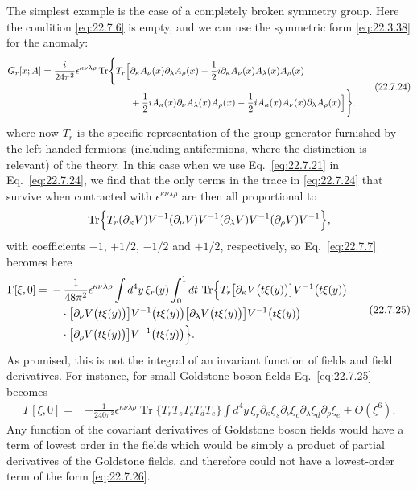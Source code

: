 The simplest example is the case of a completely broken symmetry group.
Here the condition \eqref{eq:22.7.6} is empty, and we can use the symmetric
form \eqref{eq:22.3.38} for the anomaly:
\begin{equation}
 \begin{aligned}
 G_r[x;A]
 =\frac{i}{24\pi^2}\epsilon^{\kappa\nu\lambda\rho}
 \operatorname{Tr}\Biggl\{T_r\Bigl[
 &\partial_\kappa A_\nu(x)\partial_\lambda A_\rho(x)
 -\frac{1}{2}i\partial_\kappa A_\nu(x)A_\lambda(x)A_\rho(x)
 \\
 &+\frac{1}{2}iA_\kappa(x)\partial_\nu A_\lambda(x)A_\rho(x)
 -\frac{1}{2}iA_\kappa(x)A_\nu(x)\partial_\lambda A_\rho(x)
 \Bigr]\Biggr\}.
 \end{aligned}
 \tag{22.7.24}\label{eq:22.7.24}
\end{equation}
where now $T_r$ is the specific representation of the group generator
furnished by the left-handed fermions (including antifermions, where the
distinction is relevant) of the theory. In this case when we use
Eq.~\eqref{eq:22.7.21} in Eq.~\eqref{eq:22.7.24}, we find that the only
terms in the trace in \eqref{eq:22.7.24} that survive when contracted with
$\epsilon^{\kappa\nu\lambda\rho}$ are then all proportional to
\[
 \operatorname{Tr}\Bigl\{
 T_r(\partial_\kappa V)V^{-1}(\partial_\nu V)V^{-1}
 (\partial_\lambda V)V^{-1}(\partial_\rho V)V^{-1}
 \Bigr\},
\]
with coefficients $-1$, $+1/2$, $-1/2$ and $+1/2$, respectively, so
Eq.~\eqref{eq:22.7.7} becomes here
\begin{equation}
 \begin{aligned}
 \Gamma[\xi,0]
 ={}&-\frac{1}{48\pi^2}\epsilon^{\kappa\nu\lambda\rho}
 \int d^4y\,\xi_r(y)\int_0^1dt\,
 \operatorname{Tr}\Bigl\{
 T_r\bigl[\partial_\kappa V\bigl(t\xi(y)\bigr)\bigr]
 V^{-1}\bigl(t\xi(y)\bigr)
 \\
 &\quad{}\cdot
 \bigl[\partial_\nu V\bigl(t\xi(y)\bigr)\bigr]
 V^{-1}\bigl(t\xi(y)\bigr)
 \bigl[\partial_\lambda V\bigl(t\xi(y)\bigr)\bigr]
 V^{-1}\bigl(t\xi(y)\bigr)
 \\
 &\quad{}\cdot
 \bigl[\partial_\rho V\bigl(t\xi(y)\bigr)\bigr]
 V^{-1}\bigl(t\xi(y)\bigr)
 \Bigr\}.
 \end{aligned}
 \tag{22.7.25}\label{eq:22.7.25}
\end{equation}
As promised, this is not the integral of an invariant function of fields
and field derivatives. For instance, for small Goldstone boson fields
Eq.~\eqref{eq:22.7.25} becomes
\begin{equation}
 \begin{aligned}
 \Gamma[\xi,0]
 ={}&-\frac{1}{240\pi^2}\epsilon^{\kappa\nu\lambda\rho}
 \operatorname{Tr}\{T_rT_sT_cT_dT_e\}
 \int d^4y\,\xi_r\partial_\kappa\xi_s\partial_\nu\xi_c
 \partial_\lambda\xi_d\partial_\rho\xi_e
 +O(\xi^6).
 \end{aligned}
 \tag{22.7.26}\label{eq:22.7.26}
\end{equation}
Any function of the covariant derivatives of Goldstone boson fields would
have a term of lowest order in the fields which would be simply a product
of partial derivatives of the Goldstone fields, and therefore could not
have a lowest-order term of the form \eqref{eq:22.7.26}.

